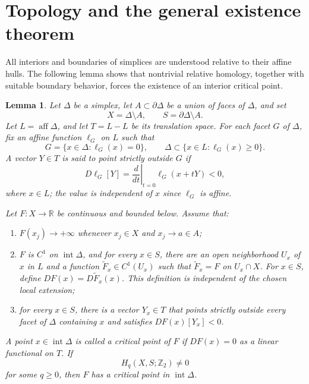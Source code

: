 \documentclass[12pt,reqno]{amsart}
\numberwithin{equation}{section}
\newtheorem{lemma}[theorem]{Lemma}
\theoremstyle{remark}
\newcommand{\R}{\mathbb R}
\begin{document}
\section{Topology and the general existence theorem}\label{sec:topology}
All interiors and boundaries of simplices are understood relative to
their affine hulls. The following lemma shows that nontrivial relative homology, together with suitable boundary behavior, forces the existence of an interior critical point.

\begin{lemma}\label{lem:relative-critical-point}
	Let \(\Delta\) be a simplex, let
	\(A\subset\partial\Delta\) be a union of faces of \(\Delta\), and set
	\[
	X=\Delta\setminus A,
	\qquad
	S=\partial\Delta\setminus A.
	\]
	Let \(L=\operatorname{aff}\Delta\), and let \(T=L-L\) be its
	translation space. For each facet \(G\) of \(\Delta\), fix an
	affine function \(\ell_G\) on \(L\) such that
	\[
	G=\{x\in\Delta:\ell_G(x)=0\},
	\qquad
	\Delta\subset\{x\in L:\ell_G(x)\geq0\}.
	\]
	A vector \(Y\in T\) is said to point strictly outside \(G\) if
	\[
	D\ell_G[Y]
	=
	\left.\frac{d}{dt}\right|_{t=0}\ell_G(x+tY)<0,
	\]
	where \(x\in L\); the value is independent of \(x\) since
	\(\ell_G\) is affine.

	
	Let \(F:X\to\R\) be continuous and bounded below. Assume that:
	\begin{enumerate}[label=\textup{(\roman*)},leftmargin=2.4em]
		\item
		\(F(x_j)\to+\infty\) whenever \(x_j\in X\) and
		\(x_j\to a\in A\);
		
		\item
		\(F\) is \(C^1\) on \(\operatorname{int}\Delta\), and for
		every \(x\in S\), there are an open neighborhood \(U_x\) of
		\(x\) in \(L\) and a function
		\(\widetilde F_x\in C^1(U_x)\) such that
		\(\widetilde F_x=F\) on \(U_x\cap X\).
		For \(x\in S\), define
		\(
		DF(x)=D\widetilde F_x(x)
		\).
		This definition is independent of the chosen local extension;
		
		\item
		for every \(x\in S\), there is a vector \(Y_x\in T\) that
		points strictly outside every facet of \(\Delta\) containing
		\(x\) and satisfies
		\(
		DF(x)[Y_x]<0
		\).
	\end{enumerate}
	A point \(x\in\operatorname{int}\Delta\) is called a critical
	point of \(F\) if \(DF(x)=0\) as a linear functional on \(T\).
	If
	\[
	H_q(X,S;\mathbb Z_2)\neq0
	\]
	for some \(q\geq0\), then \(F\) has a critical point in
	\(\operatorname{int}\Delta\).
\end{lemma}
\end{document}
